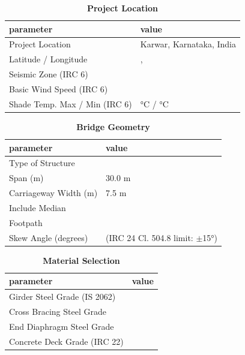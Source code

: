 \documentclass[12pt,a4paper]{report}
\numberwithin{table}{chapter}
\numberwithin{figure}{chapter}
\begin{document}
\begin{table}[H]
\caption{\textbf{Project Location}}
\label{subsec:project-location}
\begin{tabular}{|L{5.5cm}|L{8.5cm}|}
\hline
\textbf{parameter} & \textbf{value} \\
\hline
\textnormal{Project Location} & Karwar, Karnataka, India \\
\hline
\textnormal{Latitude / Longitude} & ,  \\
\hline
\textnormal{Seismic Zone (IRC 6)} &  \\
\hline
\textnormal{Basic Wind Speed (IRC 6)} &  \\
\hline
\textnormal{Shade Temp. Max / Min (IRC 6)} &  °C /  °C \\
\hline
\end{tabular}
\vspace{0.4cm}
\end{table}

\begin{table}[H]
\caption{\textbf{Bridge Geometry}}
\label{subsec:bridge-geometry}
\begin{tabular}{|L{5.5cm}|L{8.5cm}|}
\hline
\textbf{parameter} & \textbf{value} \\
\hline
\textnormal{Type of Structure} &  \\
\hline
\textnormal{Span (m)} & 30.0 m \\
\hline
\textnormal{Carriageway Width (m)} & 7.5 m \\
\hline
\textnormal{Include Median} &  \\
\hline
\textnormal{Footpath} &  \\
\hline
\textnormal{Skew Angle (degrees)} &  (IRC 24 Cl. 504.8 limit: $\pm$15°) \\
\hline
\end{tabular}
\end{table}
\vspace{0.4cm}

\begin{table}[H]
\caption{\textbf{Material Selection}}
\label{subsec:material}
\begin{tabular}{|L{5.5cm}|L{8.5cm}|}
\hline
\textbf{parameter} & \textbf{value} \\
\hline
\textnormal{Girder Steel Grade (IS 2062)} &  \\
\hline
\textnormal{Cross Bracing Steel Grade} &  \\
\hline
\textnormal{End Diaphragm Steel Grade} &  \\
\hline
\textnormal{Concrete Deck Grade (IRC 22)} &  \\
\hline
\end{tabular}
\end{table}
\vspace{0.4cm}
\end{document}

